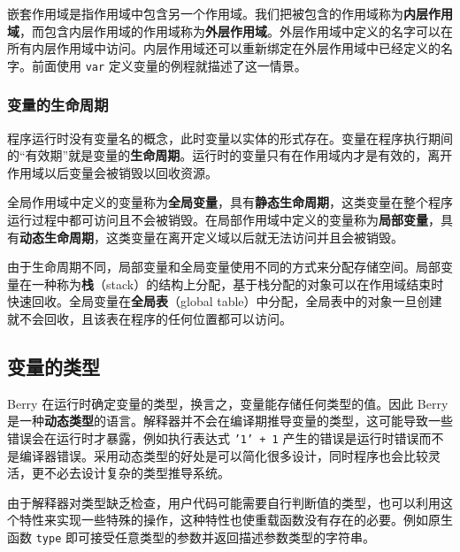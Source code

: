 嵌套作用域是指作用域中包含另一个作用域。我们把被包含的作用域称为\textbf{内层作用域}，而包含内层作用域的作用域称为\textbf{外层作用域}。外层作用域中定义的名字可以在所有内层作用域中访问。内层作用域还可以重新绑定在外层作用域中已经定义的名字。前面使用 \texttt{var} 定义变量的例程就描述了这一情景。

\subsubsection{变量的生命周期}

程序运行时没有变量名的概念，此时变量以实体的形式存在。变量在程序执行期间的``有效期''就是变量的\textbf{生命周期}。运行时的变量只有在作用域内才是有效的，离开作用域以后变量会被销毁以回收资源。

全局作用域中定义的变量称为\textbf{全局变量}，具有\textbf{静态生命周期}，这类变量在整个程序运行过程中都可访问且不会被销毁。在局部作用域中定义的变量称为\textbf{局部变量}，具有\textbf{动态生命周期}，这类变量在离开定义域以后就无法访问并且会被销毁。

由于生命周期不同，局部变量和全局变量使用不同的方式来分配存储空间。局部变量在一种称为\textbf{栈}（stack）的结构上分配，基于栈分配的对象可以在作用域结束时快速回收。全局变量在\textbf{全局表}（global table）中分配，全局表中的对象一旦创建就不会回收，且该表在程序的任何位置都可以访问。

\subsection{变量的类型}

Berry 在运行时确定变量的类型，换言之，变量能存储任何类型的值。因此 Berry 是一种\textbf{动态类型}的语言。解释器并不会在编译期推导变量的类型，这可能导致一些错误会在运行时才暴露，例如执行表达式 \texttt{'1' + 1} 产生的错误是运行时错误而不是编译器错误。采用动态类型的好处是可以简化很多设计，同时程序也会比较灵活，更不必去设计复杂的类型推导系统。

由于解释器对类型缺乏检查，用户代码可能需要自行判断值的类型，也可以利用这个特性来实现一些特殊的操作，这种特性也使重载函数没有存在的必要。例如原生函数 \texttt{type} 即可接受任意类型的参数并返回描述参数类型的字符串。

